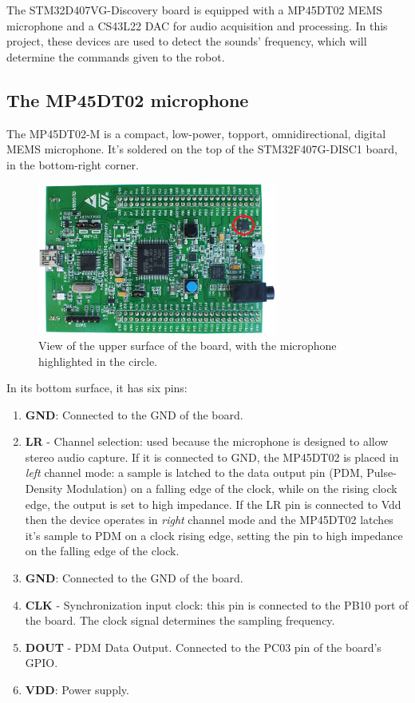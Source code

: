 \author{Fabrizio}
The STM32D407VG-Discovery board is equipped with a MP45DT02 MEMS microphone and a CS43L22 DAC for audio acquisition and processing. In this project, these devices are used to detect the sounds' frequency, which will determine the commands given to the robot.

\subsection{The MP45DT02 microphone}
The MP45DT02-M is a compact, low-power, topport, omnidirectional, digital MEMS microphone. It's soldered on the top of the STM32F407G-DISC1 board, in the bottom-right corner.
\begin{figure}[H]
	\hspace*{0.15 \textwidth}\includegraphics[width= 0.7\textwidth]
	{files/images/board_view}
	\caption{View of the upper surface of the board, with the microphone highlighted in the circle.}
\end{figure}

In its bottom surface, it has six pins:
\begin{enumerate}
	\item \textbf{GND}: Connected to the GND of the board.
	\item \textbf{LR} - Channel selection: used because the microphone is designed to allow stereo audio capture. If it is connected to GND, the MP45DT02 is placed in \textit{left} channel mode: a sample is latched to the data output pin (PDM, Pulse-Density Modulation) on a falling edge of the clock, while on the rising clock edge, the output is set to high impedance. If the LR pin is connected to Vdd then the device operates in \textit{right} channel mode and the MP45DT02 latches it's sample to PDM on a clock rising edge, setting the pin to high impedance on the falling edge of the clock.
	\item \textbf{GND}: Connected to the GND of the board.
	\item \textbf{CLK} - Synchronization input clock: this pin is connected to the PB10 port of the board. The clock signal determines the sampling frequency.
	\item \textbf{DOUT} - PDM Data Output. Connected to the PC03 pin of the board's GPIO.
	\item \textbf{VDD}: Power supply.
\end{enumerate}

